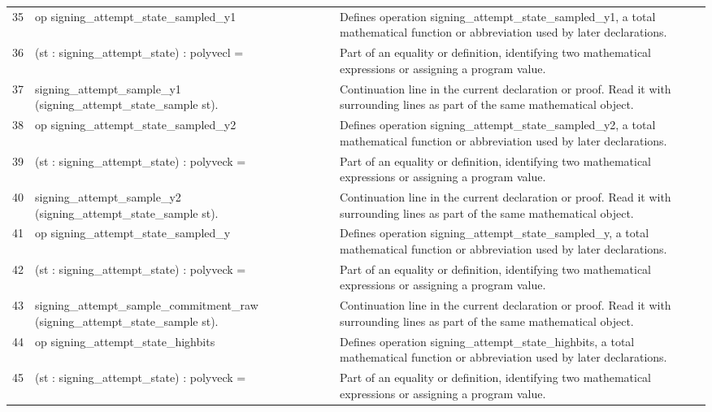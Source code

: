 \documentclass[10pt]{article}
\begin{document}
\begin{longtable}{r L{0.53\textwidth} L{0.37\textwidth}}
35 & {\ttfamily\scriptsize op signing\_attempt\_state\_sampled\_y1} & Defines operation signing\_attempt\_state\_sampled\_y1, a total mathematical function or abbreviation used by later declarations. \\
36 & {\ttfamily\scriptsize    (st : signing\_attempt\_state) : polyvecl =} & Part of an equality or definition, identifying two mathematical expressions or assigning a program value. \\
37 & {\ttfamily\scriptsize   signing\_attempt\_sample\_y1 (signing\_attempt\_state\_sample st).} & Continuation line in the current declaration or proof.  Read it with surrounding lines as part of the same mathematical object. \\
38 & {\ttfamily\scriptsize op signing\_attempt\_state\_sampled\_y2} & Defines operation signing\_attempt\_state\_sampled\_y2, a total mathematical function or abbreviation used by later declarations. \\
39 & {\ttfamily\scriptsize    (st : signing\_attempt\_state) : polyveck =} & Part of an equality or definition, identifying two mathematical expressions or assigning a program value. \\
40 & {\ttfamily\scriptsize   signing\_attempt\_sample\_y2 (signing\_attempt\_state\_sample st).} & Continuation line in the current declaration or proof.  Read it with surrounding lines as part of the same mathematical object. \\
41 & {\ttfamily\scriptsize op signing\_attempt\_state\_sampled\_y} & Defines operation signing\_attempt\_state\_sampled\_y, a total mathematical function or abbreviation used by later declarations. \\
42 & {\ttfamily\scriptsize    (st : signing\_attempt\_state) : polyveck =} & Part of an equality or definition, identifying two mathematical expressions or assigning a program value. \\
43 & {\ttfamily\scriptsize   signing\_attempt\_sample\_commitment\_raw (signing\_attempt\_state\_sample st).} & Continuation line in the current declaration or proof.  Read it with surrounding lines as part of the same mathematical object. \\
44 & {\ttfamily\scriptsize op signing\_attempt\_state\_highbits} & Defines operation signing\_attempt\_state\_highbits, a total mathematical function or abbreviation used by later declarations. \\
45 & {\ttfamily\scriptsize    (st : signing\_attempt\_state) : polyveck =} & Part of an equality or definition, identifying two mathematical expressions or assigning a program value. \\

\end{longtable}
\end{document}
